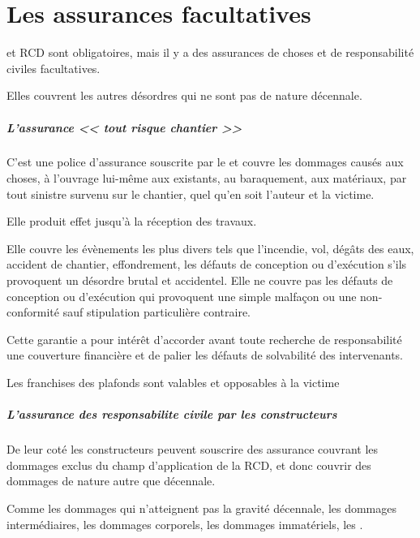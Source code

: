 
\chapter{Les assurances facultatives}

	\DO et RCD sont obligatoires, mais il y a des assurances de choses et de responsabilité civiles facultatives.

	Elles couvrent les autres désordres qui ne sont pas de nature décennale.

	\paragraph{L'assurance << tout risque chantier >>}

		C’est une police d’assurance souscrite par le \MO et couvre les dommages causés aux choses, à l’ouvrage lui-même aux existants, au baraquement, aux matériaux, par tout sinistre survenu sur le chantier, quel qu’en soit l’auteur et la victime.

		Elle produit effet jusqu’à la réception des travaux.

		\medbreak Elle couvre les évènements les plus divers tels que l’incendie, vol, dégâts des eaux, accident de chantier, effondrement, les défauts de conception ou d’exécution s’ils provoquent un désordre brutal et accidentel. Elle ne couvre pas les défauts de conception ou d’exécution qui provoquent une simple malfaçon ou une non-conformité sauf stipulation particulière contraire.

		\medbreak Cette garantie a pour intérêt d’accorder avant toute recherche de responsabilité une couverture financière et de palier les défauts de solvabilité des intervenants.

		Les franchises des plafonds sont valables et opposables à la victime

	\paragraph{L’assurance des responsabilite civile par les constructeurs}

		De leur coté les constructeurs peuvent souscrire des assurance couvrant les dommages exclus du champ d’application de la RCD, et donc couvrir des dommages de nature autre que décennale.

		Comme les dommages qui n’atteignent pas la gravité décennale, les dommages intermédiaires, les dommages corporels, les dommages immatériels, les \TAV.

